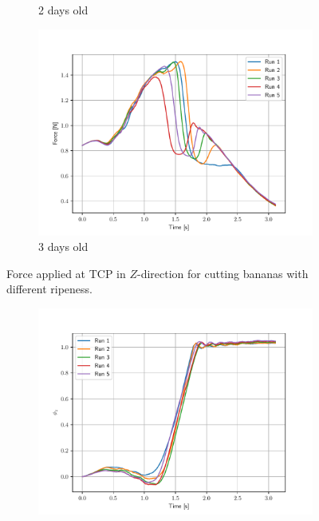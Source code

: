 \documentclass[aspectratio=169]{beamer}
\newenvironment{figure*}%
{\begin{figure}}
	{\end{figure}}
\begin{document}
\begin{frame}
\begin{figure}[t]
\begin{subfigure}[t]{0.32\textwidth}
			\caption{\scriptsize 2 days old}
			\label{EX:f_banana_2}
		\end{subfigure}
		\begin{subfigure}[t]{0.32\textwidth}
			\centering
			\includegraphics[width=\textwidth]{images/f_banana_3.pdf}
			\vspace{-0.32cm}
			\caption{\scriptsize 3 days old}
			\label{EX:f_banana_3}
		\end{subfigure}
		\vspace{-0.5cm}
		\caption{Force applied at TCP in $Z$-direction for cutting bananas with different ripeness.}
		\label{EX:f_banana}
	\end{figure}
	\vspace{-0.85cm}
\begin{figure}[t]
	\begin{subfigure}[t]{0.32\linewidth}
		\centering
		\includegraphics[width=\textwidth]{images/ph_banana_1.pdf}

\end{subfigure}
\end{figure}
\end{frame}
\end{document}
